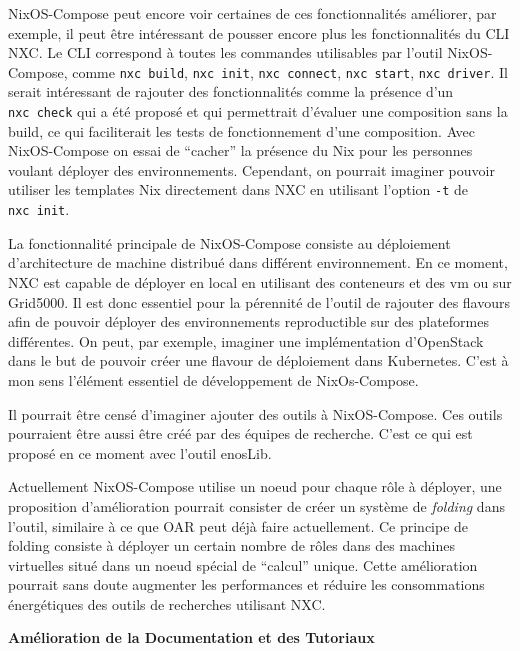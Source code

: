 \documentclass[a4paper,french,12pt, titlepage]{article}
\begin{document}
NixOS-Compose peut encore voir certaines de ces fonctionnalités
améliorer, par exemple, il peut être intéressant de pousser encore plus
les fonctionnalités du CLI NXC. Le CLI correspond à toutes les commandes
utilisables par l'outil NixOS-Compose, comme \texttt{nxc\ build},
\texttt{nxc\ init}, \texttt{nxc\ connect}, \texttt{nxc\ start},
\texttt{nxc\ driver}. Il serait intéressant de rajouter des
fonctionnalités comme la présence d'un \texttt{nxc\ check} qui a été
proposé et qui permettrait d'évaluer une composition sans la build, ce
qui faciliterait les tests de fonctionnement d'une composition. Avec
NixOS-Compose on essai de ``cacher'' la présence du Nix pour les
personnes voulant déployer des environnements. Cependant, on pourrait
imaginer pouvoir utiliser les templates Nix directement dans NXC en
utilisant l'option \texttt{-t} de \texttt{nxc\ init}.\newline

La fonctionnalité principale de NixOS-Compose consiste au déploiement
d'architecture de machine distribué dans différent environnement. En ce
moment, NXC est capable de déployer en local en utilisant des conteneurs
et des vm ou sur Grid5000. Il est donc essentiel pour la pérennité de
l'outil de rajouter des flavours afin de pouvoir déployer des
environnements reproductible sur des plateformes différentes. On peut,
par exemple, imaginer une implémentation d'OpenStack dans le but de
pouvoir créer une flavour de déploiement dans Kubernetes. C'est à mon
sens l'élément essentiel de développement de NixOs-Compose.\newline

Il pourrait être censé d'imaginer ajouter des outils à NixOS-Compose.
Ces outils pourraient être aussi être créé par des équipes de recherche.
C'est ce qui est proposé en ce moment avec l'outil enosLib.\newline

Actuellement NixOS-Compose utilise un noeud pour chaque rôle à déployer,
une proposition d'amélioration pourrait consister de créer un système de
\emph{folding} dans l'outil, similaire à ce que OAR peut déjà faire
actuellement. Ce principe de folding consiste à déployer un certain
nombre de rôles dans des machines virtuelles situé dans un noeud spécial
de ``calcul'' unique. Cette amélioration pourrait sans doute augmenter
les performances et réduire les consommations énergétiques des outils de
recherches utilisant NXC.\newline

\textbf{Amélioration de la Documentation et des Tutoriaux}\newline
\end{document}
